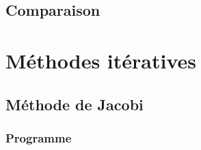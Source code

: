 \documentclass{report}
\begin{document}
    \section{Comparaison}
    \newpage
     
  \chapter{Méthodes itératives}
  	\section{Méthode de Jacobi}
  	  \subsection{Programme}
        
      \newpage
\end{document}
